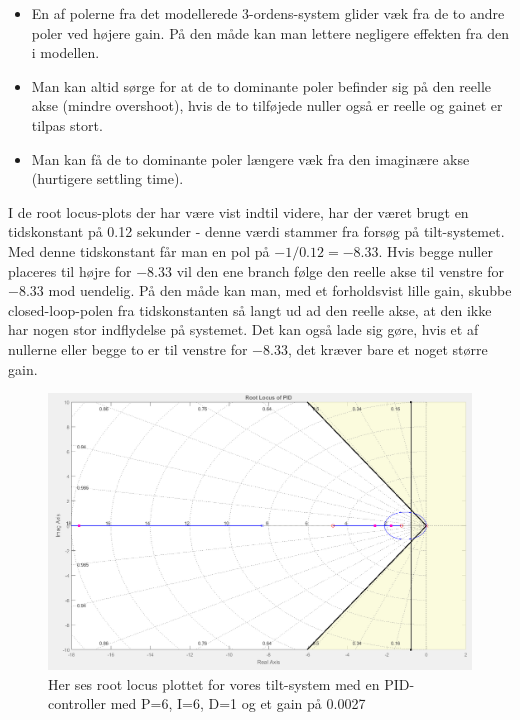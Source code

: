\begin{itemize}
	\item 	En af polerne fra det modellerede 3-ordens-system glider væk fra de to 					andre poler ved højere gain. På den måde kan man lettere negligere 						effekten fra den i modellen.
	\item  	Man kan altid sørge for at de to dominante poler befinder sig på den 				   	reelle akse (mindre overshoot), hvis de to tilføjede nuller også er 					reelle og gainet er tilpas stort. 
	\item  	Man kan få de to dominante poler længere væk fra den imaginære akse 					(hurtigere settling time).
\end{itemize}

I de root locus-plots der har være vist indtil videre, har der været brugt en tidskonstant på 0.12 sekunder - denne værdi stammer fra forsøg på tilt-systemet. Med denne tidskonstant får man en pol på $-1/0.12=-8.33$. Hvis begge nuller placeres til højre for $-8.33$ vil den ene branch følge den reelle akse til venstre for $-8.33$ mod uendelig. På den måde kan man, med et forholdsvist lille gain, skubbe closed-loop-polen fra tidskonstanten så langt ud ad den reelle akse, at den ikke har nogen stor indflydelse på systemet. Det kan også lade sig gøre, hvis et af nullerne eller begge to er til venstre for $-8.33$, det kræver bare et noget større gain.

\begin{figure}[ht]
	\begin{center}
		\includegraphics[scale=0.45]{Billeder/PID_rlocus.PNG}
	\end{center}
\caption{Her ses root locus plottet for vores tilt-system med en PID-controller med P=6, I=6, D=1 og et gain på 0.0027}
\label{fig:PID_rlocus}
\end{figure}